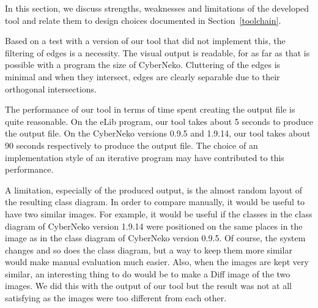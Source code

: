 In this section, we discuss strengths, weaknesses and limitations of the developed tool and relate them to design choices documented in Section~\ref{toolchain}. 

Based on a test with a version of our tool that did not implement this, the filtering of edges is a necessity.
The visual output is readable, for as far as that is possible with a program the size of CyberNeko.
Cluttering of the edges is minimal and when they intersect, edges are clearly separable due to their orthogonal intersections.

The performance of our tool in terms of time spent creating the output file is quite reasonable.
On the eLib program, our tool takes about 5 seconds to produce the output file.
On the CyberNeko versions 0.9.5 and 1.9.14, our tool takes about 90 seconds respectively to produce the output file.
The choice of an implementation style of an iterative program may have contributed to this performance.

A limitation, especially of the produced output, is the almost random layout of the resulting class diagram.
In order to compare manually, it would be useful to have two similar images.
For example, it would be useful if the classes in the class diagram of CyberNeko version 1.9.14 were positioned on the same places in the image as in the class diagram of CyberNeko version 0.9.5. 
Of course, the system changes and so does the class diagram, but a way to keep them more similar would make manual evaluation much easier. 
Also, when the images are kept very similar, an interesting thing to do would be to make a Diff image of the two images.
We did this with the output of our tool but the result was not at all satisfying as the images were too different from each other.

